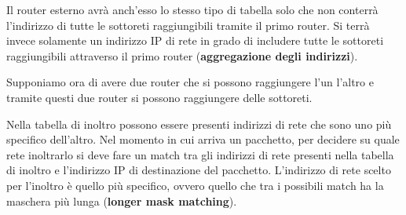 Il router esterno avrà anch'esso lo stesso tipo di tabella solo che 
non conterrà l'indirizzo di tutte le sottoreti raggiungibili tramite
il primo router. Si terrà invece solamente un indirizzo IP di rete in
grado di includere tutte le sottoreti raggiungibili attraverso il primo
router (\textbf{aggregazione degli indirizzi}).

Supponiamo ora di avere due router che si possono raggiungere l'un
l'altro e tramite questi due router si possono raggiungere delle
sottoreti.

Nella tabella di inoltro possono essere presenti indirizzi di rete che
sono uno più specifico dell'altro. Nel momento in cui arriva un
pacchetto, per decidere su quale rete inoltrarlo si deve fare un match
tra gli indirizzi di rete presenti nella tabella di inoltro e 
l'indirizzo IP di destinazione del pacchetto. L'indirizzo di rete 
scelto per l'inoltro è quello più specifico, ovvero quello che tra i
possibili match ha la maschera più lunga 
(\textbf{longer mask matching}).

